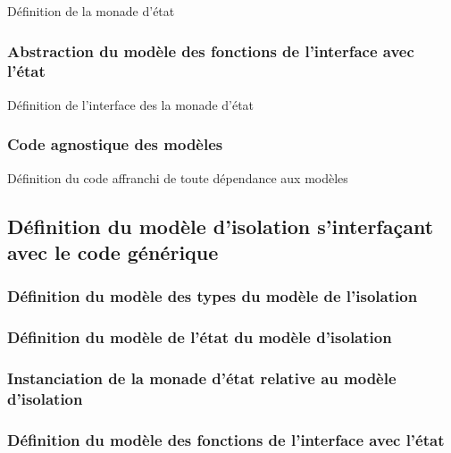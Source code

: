 			\begin{listing}[!ht]
				\caption{Définition de la monade d'état}
				\label{code:StateAgnosticMonad}
			\end{listing}

			\subsubsection{Abstraction du modèle des fonctions de l'interface avec l'état}

			\begin{listing}[!ht]
				\caption{Définition de l'interface des la monade d'état}
				\label{code:InterfaceParameters}
			\end{listing}

			\subsubsection{Code agnostique des modèles}

			\begin{listing}[!ht]
				\caption{Définition du code affranchi de toute dépendance aux modèles}
				\label{code:ModelAgnosticCode}
			\end{listing}

		\subsection{Définition du modèle d'isolation s'interfaçant avec le code générique}
			\subsubsection{Définition du modèle des types du modèle de l'isolation}

			\subsubsection{Définition du modèle de l'état du modèle d'isolation}

			\subsubsection{Instanciation de la monade d'état relative au modèle d'isolation}

			\subsubsection{Définition du modèle des fonctions de l'interface avec l'état}

